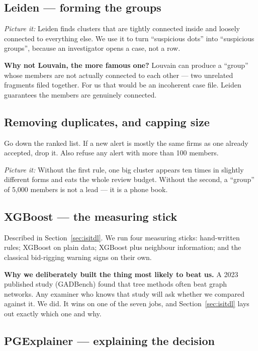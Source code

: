 \documentclass[11pt,a4paper]{article}
\newcommand{\pw}[1]{\textit{\textcolor{accent}{Picture it:}} #1}
\begin{document}
\subsection{Leiden --- forming the groups}

\pw{Leiden finds clusters that are tightly connected inside and loosely connected
to everything else. We use it to turn ``suspicious dots'' into ``suspicious
groups'', because an investigator opens a case, not a row.}

\textbf{Why not Louvain, the more famous one?} Louvain can produce a ``group''
whose members are not actually connected to each other --- two unrelated fragments
filed together. For us that would be an incoherent case file. Leiden guarantees
the members are genuinely connected.

\subsection{Removing duplicates, and capping size}

Go down the ranked list. If a new alert is mostly the same firms as one already
accepted, drop it. Also refuse any alert with more than 100 members.

\pw{Without the first rule, one big cluster appears ten times in slightly
different forms and eats the whole review budget. Without the second, a ``group''
of 5{,}000 members is not a lead --- it is a phone book.}

\subsection{XGBoost --- the measuring stick}

Described in Section~\ref{sec:isitdl}. We run four measuring sticks: hand-written
rules; XGBoost on plain data; XGBoost plus neighbour information; and the
classical bid-rigging warning signs on their own.

\begin{warnbox}
\textbf{Why we deliberately built the thing most likely to beat us.} A 2023
published study (GADBench) found that tree methods often beat graph networks. Any
examiner who knows that study will ask whether we compared against it. We did.
It wins on one of the seven jobs, and Section~\ref{sec:isitdl} lays out exactly
which one and why.
\end{warnbox}

\subsection{PGExplainer --- explaining the decision}
\end{document}
